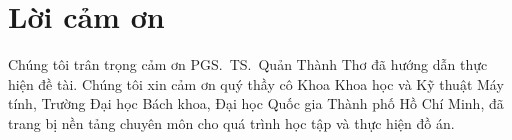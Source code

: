 \chapter*{Lời cảm ơn}
Chúng tôi trân trọng cảm ơn PGS.\ TS.\ Quản Thành Thơ đã hướng dẫn thực hiện đề tài. Chúng tôi xin cảm ơn quý thầy cô Khoa Khoa học và Kỹ thuật Máy tính, Trường Đại học Bách khoa, Đại học Quốc gia Thành phố Hồ Chí Minh, đã trang bị nền tảng chuyên môn cho quá trình học tập và thực hiện đồ án.

